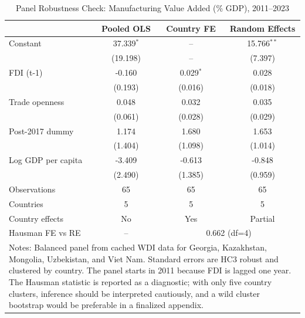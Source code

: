 
\begin{table}[!htbp]\centering
\caption{Panel Robustness Check: Manufacturing Value Added (\% GDP), 2011--2023}
\label{tab:panel_robustness}
\small
\begin{tabular}{lccc}
\hline\hline
 & Pooled OLS & Country FE & Random Effects \\
\hline
Constant & 37.339$^{*}$ & -- & 15.766$^{**}$ \\
 & (19.198) & -- & (7.397) \\
FDI (t-1) & -0.160 & 0.029$^{*}$ & 0.028 \\
 & (0.193) & (0.016) & (0.018) \\
Trade openness & 0.048 & 0.032 & 0.035 \\
 & (0.061) & (0.028) & (0.029) \\
Post-2017 dummy & 1.174 & 1.680 & 1.653 \\
 & (1.404) & (1.098) & (1.014) \\
Log GDP per capita & -3.409 & -0.613 & -0.848 \\
 & (2.490) & (1.385) & (0.959) \\
\hline
Observations & 65 & 65 & 65 \\
Countries & 5 & 5 & 5 \\
Country effects & No & Yes & Partial \\
Hausman FE vs RE & -- & \multicolumn{2}{c}{0.662 (df=4)} \\
\hline\hline
\multicolumn{4}{p{0.92\textwidth}}{\footnotesize Notes: Balanced panel from cached WDI data for Georgia, Kazakhstan, Mongolia, Uzbekistan, and Viet Nam. Standard errors are HC3 robust and clustered by country. The panel starts in 2011 because FDI is lagged one year. The Hausman statistic is reported as a diagnostic; with only five country clusters, inference should be interpreted cautiously, and a wild cluster bootstrap would be preferable in a finalized appendix.} \\
\end{tabular}
\end{table}

